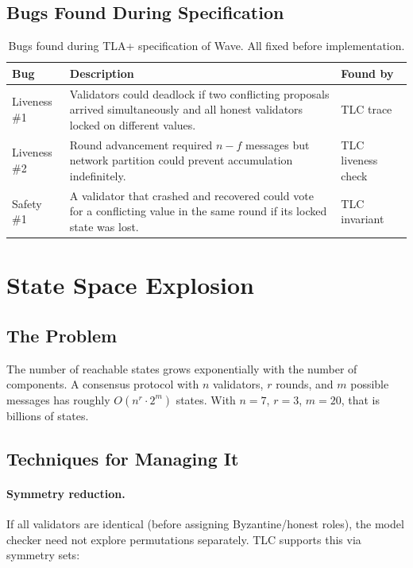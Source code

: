 \documentclass[11pt,a4paper]{article}
\begin{document}
\subsection{Bugs Found During Specification}

\begin{table}[H]
\centering
\small
\begin{tabular}{@{}lp{7cm}l@{}}
\toprule
\textbf{Bug} & \textbf{Description} & \textbf{Found by} \\
\midrule
Liveness \#1 & Validators could deadlock if two conflicting proposals arrived simultaneously and all honest validators locked on different values. & TLC trace \\
Liveness \#2 & Round advancement required $n - f$ messages but network partition could prevent accumulation indefinitely. & TLC liveness check \\
Safety \#1 & A validator that crashed and recovered could vote for a conflicting value in the same round if its locked state was lost. & TLC invariant \\
\bottomrule
\end{tabular}
\caption{Bugs found during TLA+ specification of Wave. All fixed before implementation.}
\end{table}

\section{State Space Explosion}

\subsection{The Problem}

The number of reachable states grows exponentially with the number of components.
A consensus protocol with $n$ validators, $r$ rounds, and $m$ possible messages has
roughly $O(n^r \cdot 2^m)$ states. With $n = 7$, $r = 3$, $m = 20$, that is billions
of states.

\subsection{Techniques for Managing It}

\paragraph{Symmetry reduction.}
If all validators are identical (before assigning Byzantine/honest roles), the model
checker need not explore permutations separately. TLC supports this via symmetry sets:
\end{document}
